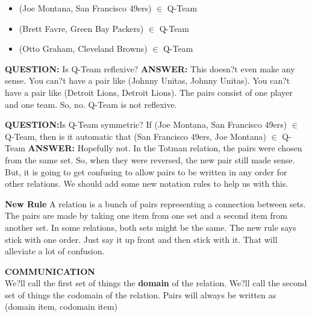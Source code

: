 \documentclass{ximera}
\begin{document}
\begin{example}
\begin{itemize}
 \item (Joe Montana, San Francisco 49ers) $\in$ Q-Team
 \item (Brett Favre, Green Bay Packers) $\in$ Q-Team
 \item (Otto Graham, Cleveland Browns) $\in$ Q-Team
\end{itemize}
\end{example}





\textbf{QUESTION:} Is Q-Team reflexive? 
\textbf{ANSWER:} This doesn?t even make any sense.  You can?t have a pair like (Johnny Unitas, Johnny Unitas). You can?t have a pair like (Detroit Lions, Detroit Lions).  The pairs consist of one player and one team.
So, no. Q-Team is not reflexive.


\textbf{QUESTION:}Is Q-Team symmetric?
If (Joe Montana, San Francisco 49ers) $\in$ Q-Team, then is it automatic that (San Francisco 49ers, Joe Montana) $\in$ Q-Team
\textbf{ANSWER:} Hopefully not.
In the Totman relation, the pairs were chosen from the same set.  So, when they were reversed, the new pair still made sense.  But, it is going to get confusing to allow pairs to be written in any order for other relations.
We should add some new notation rules to help us with this.


\textbf{New Rule}
A relation is a bunch of pairs representing a connection between sets.  The pairs are made by taking one item from one set and a second item from another set. In some relations, both sets might be the same.  The new rule says stick with one order.  Just say it up front and then stick with it.  That will alleviate a lot of confusion.



\begin{remark} \textbf{COMMUNICATION} \\
We?ll call the first set of things the \textbf{domain} of the relation.
We?ll call the second set of things the codomain of the relation.
Pairs will always be written as
 (domain item, codomain item) 
\end{remark}
\end{document}
